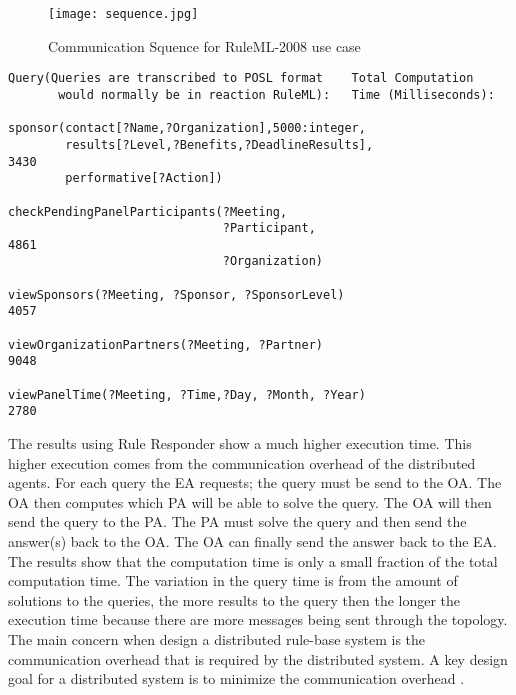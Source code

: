 \documentclass[12pt]{report}
\begin{document}
\begin{figure}
\centering
\texttt{[image: sequence.jpg]}
\caption{Communication Squence for RuleML-2008 use case}\label{fig:5}
\end{figure}
\singlespacing
\begin{verbatim}
Query(Queries are transcribed to POSL format    Total Computation   
       would normally be in reaction RuleML):   Time (Milliseconds):
                                                        
sponsor(contact[?Name,?Organization],5000:integer,
        results[?Level,?Benefits,?DeadlineResults],      			3430
        performative[?Action])
        
checkPendingPanelParticipants(?Meeting,
                              ?Participant,              			4861
                              ?Organization)
                              
viewSponsors(?Meeting, ?Sponsor, ?SponsorLevel)          			4057

viewOrganizationPartners(?Meeting, ?Partner)             			9048

viewPanelTime(?Meeting, ?Time,?Day, ?Month, ?Year)       			2780
\end{verbatim}
\doublespacing
The results using Rule Responder show a much higher execution time.  This higher execution comes from the communication overhead of the distributed agents.  For each query the EA requests; the query must be send to the OA.  The OA then computes which PA will be able to solve the query.  The OA will then send the query to the PA.  The PA must solve the query and then send the answer(s) back to the OA.  The OA can finally send the answer back to the EA.  The results show that the computation time is only a small fraction of the total computation time.  The variation in the query time is from the amount of solutions to the queries, the more results to the query then the longer the execution time because there are more messages being sent through the topology.  The main concern when design a distributed rule-base system is the communication overhead that is required by the distributed system.  A key design goal for a distributed system is to minimize the communication overhead \cite{googleDS}.
\end{document}
